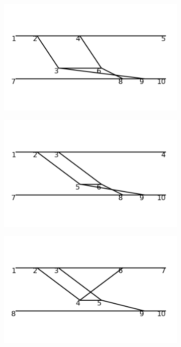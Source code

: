 \documentclass[11pt,a4paper,twoside,pdf]{article}
\numberwithin{equation}{section}
\begin{document}
\begin{figure}[h!]
\begin{subfigure}[t]{0.16\textwidth}
    \end{subfigure}
    \hfill
    \begin{subfigure}[t]{0.16\textwidth}
        \centering
        \includegraphics[width=\textwidth]{plots/order6_2to2/39.png}
    \end{subfigure}
    \hfill
    \begin{subfigure}[t]{0.16\textwidth}
        \centering
        \includegraphics[width=\textwidth]{plots/order6_2to2/40.png}
    \end{subfigure}
    \hfill
    \begin{subfigure}[t]{0.16\textwidth}
        \centering
        \includegraphics[width=\textwidth]{plots/order6_2to2/41.png}

\end{subfigure}
\end{figure}
\end{document}
